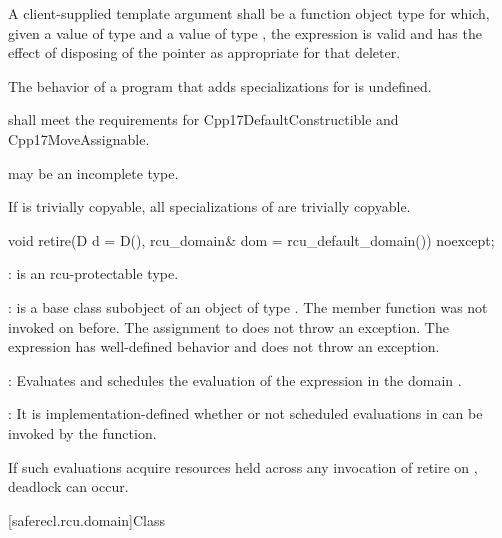 \pnum
A client-supplied template argument  shall be a
function object type  for which,
given a value  of type  and a value 
of type , the expression  is valid and
has the effect of disposing of the pointer as appropriate for
that deleter.

\pnum
The behavior of a program that adds specializations for
 is undefined.

\pnum
{} shall meet the requirements for
Cpp17DefaultConstructible and Cpp17MoveAssignable.

\pnum
{} may be an incomplete type.

\pnum
If  is trivially copyable, all specializations of
 are trivially copyable.

\begin{itemdecl}
void retire(D d = D(), rcu_domain& dom = rcu_default_domain()) noexcept;
\end{itemdecl}

\begin{itemdescr}

\pnum
{}:  is an rcu-protectable type.

\pnum
{}:  is a base class subobject of
an object  of type . The member function
 was not invoked on 
before. The assignment to  does not throw an
exception. The expression  has
well-defined behavior and does not throw an exception.

\pnum	{}: Evaluates  and schedules
the evaluation of the expression  in the domain .

\pnum	{}: It is implementation-defined whether or not scheduled
evaluations in  can be invoked by the 
function.
\begin{note}
If such evaluations acquire resources held across any invocation of
retire on , deadlock can occur.
\end{note}

\end{itemdescr}

[saferecl.rcu.domain]{Class }



